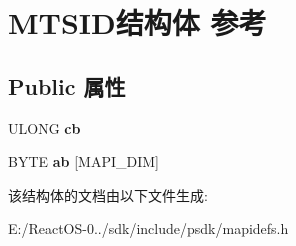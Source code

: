 \hypertarget{struct_m_t_s_i_d}{}\section{M\+T\+S\+I\+D结构体 参考}
\label{struct_m_t_s_i_d}
\subsection*{Public 属性}
\begin{DoxyCompactItemize}
\item 
\mbox{\label{struct_m_t_s_i_d_acafce52675da5c98a95169f3eed25d8c}} 
U\+L\+O\+NG {\bfseries cb}
\item 
\mbox{\label{struct_m_t_s_i_d_aa5a4fec177ff1b0534dbc5d333729cd5}} 
B\+Y\+TE {\bfseries ab} \mbox{[}M\+A\+P\+I\+\_\+\+D\+IM\mbox{]}
\end{DoxyCompactItemize}


该结构体的文档由以下文件生成\+:\begin{DoxyCompactItemize}
\item 
E\+:/\+React\+O\+S-\/0../sdk/include/psdk/mapidefs.\+h\end{DoxyCompactItemize}
